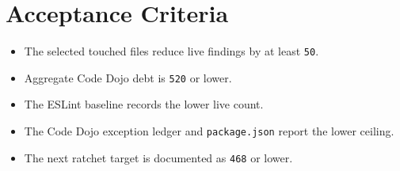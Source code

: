 \section{Acceptance Criteria}\label{record-239-acceptance-criteria}

\begin{itemize}
\tightlist
\item
  The selected touched files reduce live findings by at least \texttt{5\allowbreak{}0}.
\item
  Aggregate Code Dojo debt is \texttt{5\allowbreak{}2\allowbreak{}0} or lower.
\item
  The ESLint baseline records the lower live count.
\item
  The Code Dojo exception ledger and \texttt{p\allowbreak{}a\allowbreak{}c\allowbreak{}k\allowbreak{}a\allowbreak{}g\allowbreak{}e\allowbreak{}.\allowbreak{}j\allowbreak{}s\allowbreak{}o\allowbreak{}n} report the lower ceiling.
\item
  The next ratchet target is documented as \texttt{4\allowbreak{}6\allowbreak{}8} or lower.
\end{itemize}

